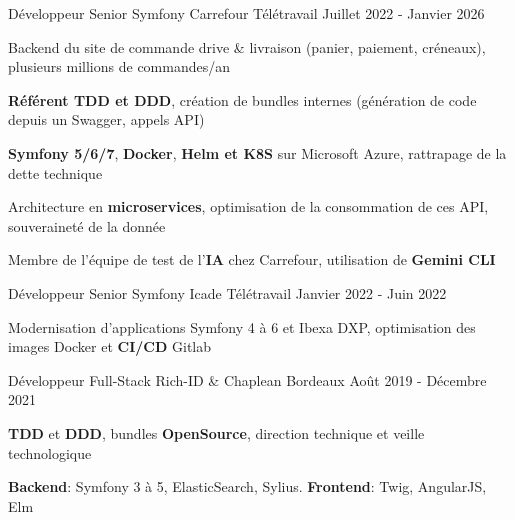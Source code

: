\begin{cventries}
	\cventry
	{Développeur Senior Symfony} %
	{Carrefour} %
	{Télétravail} %
	{Juillet 2022 - Janvier 2026} %
	{
		\begin{cvitems} %
			\item {Backend du site de commande drive \& livraison (panier, paiement, créneaux), plusieurs millions de commandes/an}
			\item {\textbf{Référent TDD et DDD}, création de bundles internes (génération de code depuis un Swagger, appels API)}
			\item {\textbf{Symfony 5/6/7}, \textbf{Docker}, \textbf{Helm et K8S} sur Microsoft Azure, rattrapage de la dette technique}
			\item {Architecture en \textbf{microservices}, optimisation de la consommation de ces API, souveraineté de la donnée}
			\item {Membre de l'équipe de test de l'\textbf{IA} chez Carrefour, utilisation de \textbf{Gemini CLI}}
		\end{cvitems}
	}

	\cventry
	{Développeur Senior Symfony} %
	{Icade} %
	{Télétravail} %
	{Janvier 2022 - Juin 2022} %
	{
		\begin{cvitems} %
			\item {Modernisation d'applications Symfony 4 à 6 et Ibexa DXP, optimisation des images Docker et \textbf{CI/CD} Gitlab}
		\end{cvitems}
	}

	\cventry
	{Développeur Full-Stack} %
	{Rich-ID \& Chaplean} %
	{Bordeaux} %
	{Août 2019 - Décembre 2021} %
	{
		\begin{cvitems} %
			\item {\textbf{TDD} et \textbf{DDD}, bundles \textbf{OpenSource}, direction technique et veille technologique}
			\item {\textbf{Backend}: Symfony 3 à 5, ElasticSearch, Sylius. \textbf{Frontend}: Twig, AngularJS, Elm}
		\end{cvitems}
	}

\end{cventries}
